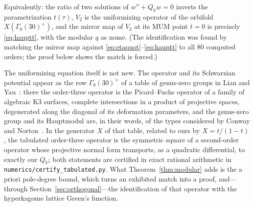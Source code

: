 \documentclass[11pt]{article}
\theoremstyle{plain}
\theoremstyle{remark}
\begin{document}
Equivalently: the ratio of two solutions of $w''+Q_Vw=0$ inverts the parametrization $t(\tau)$, $V_2$ is the
uniformizing operator of the orbifold $X(\Gamma_0(30)^+)$, and the mirror map of $V_2$ at its MUM point $t=0$
is precisely \eqref{eq:hauptt}, with the modular $q$ as nome. (The identification was found by matching the
mirror map against \eqref{eq:etaquot}--\eqref{eq:hauptt} to all $80$ computed orders; the proof below shows the
match is forced.)

The uniformizing equation itself is not new. The operator and its Schwarzian potential appear as
the row $\Gamma_0(30)^+$ of a table of genus-zero groups in Lian and Yau~\cite{LianYau1995}: there
the order-three operator is the Picard--Fuchs operator of a family of algebraic K3 surfaces,
complete intersections in a product of projective spaces, degenerated along the diagonal of its
deformation parameters, and the genus-zero group and its Hauptmodul are, in their words, of the
types considered by Conway and Norton~\cite{ConwayNorton1979}. In the generator $X$ of that table, related to ours by
$X=t/(1-t)$, the tabulated order-three operator is the symmetric square of a second-order operator
whose projective normal form transports, as a quadratic differential, to exactly our $Q_V$; both
statements are certified in exact rational arithmetic in
\texttt{numerics/\allowbreak certify\_\allowbreak tabulated.py}. What Theorem~\ref{thm:modular}
adds is the a priori pole-degree bound, which turns an exhibited match into a proof, and---through
Section~\ref{sec:orthogonal}---the identification of that operator with the hyperkagome lattice
Green's function.
\end{document}
